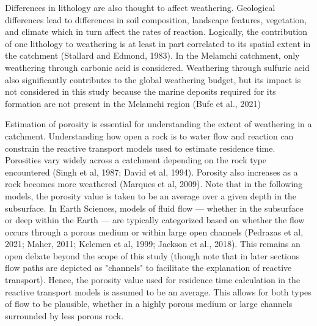Differences in lithology are also thought to affect weathering. Geological differences lead to differences in soil composition, landscape features, vegetation, and climate which in turn affect the rates of reaction. Logically, the contribution of one lithology to weathering is at least in part correlated to its spatial extent in the catchment (Stallard and Edmond, 1983). In the Melamchi catchment, only weathering through carbonic acid is considered. Weathering through sulfuric acid also significantly contributes to the global weathering budget, but its impact is not considered in this study because the marine deposits required for its formation are not present in the Melamchi region (Bufe et al., 2021) 

\bsk

Estimation of porosity is essential for understanding the extent of weathering in a catchment. Understanding how open a rock is to water flow and reaction can constrain the reactive transport models used to estimate residence time. Porosities vary widely across a catchment depending on the rock type encountered (Singh et al, 1987; David et al, 1994). Porosity also increases as a rock becomes more weathered (Marques et al, 2009). Note that in the following models, the porosity value is taken to be an average over a given depth in the subsurface. In Earth Sciences, models of fluid flow — whether in the subsurface or deep within the Earth — are typically categorized based on whether the flow occurs through a porous medium or within large open channels (Pedrazas et al, 2021; Maher, 2011; Kelemen et al, 1999; Jackson et al., 2018). This remains an open debate beyond the scope of this study (though note that in later sections flow paths are depicted as "channels" to facilitate the explanation of reactive transport). Hence, the porosity value used for residence time calculation in the reactive transport models is assumed to be an average. This allows for both types of flow to be plausible, whether in a highly porous medium or large channels surrounded by less porous rock.

\bsk

